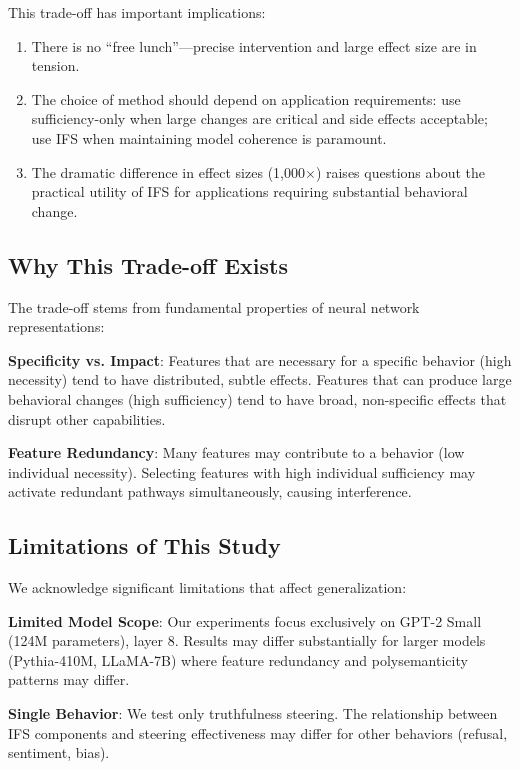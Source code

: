 \documentclass{article}
\begin{document}
This trade-off has important implications:
\begin{enumerate}
    \item There is no ``free lunch''---precise intervention and large effect size are in tension.
    \item The choice of method should depend on application requirements: use sufficiency-only when large changes are critical and side effects acceptable; use IFS when maintaining model coherence is paramount.
    \item The dramatic difference in effect sizes (1,000$\times$) raises questions about the practical utility of IFS for applications requiring substantial behavioral change.
\end{enumerate}

\subsection{Why This Trade-off Exists}

The trade-off stems from fundamental properties of neural network representations:

\textbf{Specificity vs. Impact}: Features that are necessary for a specific behavior (high necessity) tend to have distributed, subtle effects. Features that can produce large behavioral changes (high sufficiency) tend to have broad, non-specific effects that disrupt other capabilities.

\textbf{Feature Redundancy}: Many features may contribute to a behavior (low individual necessity). Selecting features with high individual sufficiency may activate redundant pathways simultaneously, causing interference.

\subsection{Limitations of This Study}

We acknowledge significant limitations that affect generalization:

\textbf{Limited Model Scope}: Our experiments focus exclusively on GPT-2 Small (124M parameters), layer 8. Results may differ substantially for larger models (Pythia-410M, LLaMA-7B) where feature redundancy and polysemanticity patterns may differ.

\textbf{Single Behavior}: We test only truthfulness steering. The relationship between IFS components and steering effectiveness may differ for other behaviors (refusal, sentiment, bias).
\end{document}
